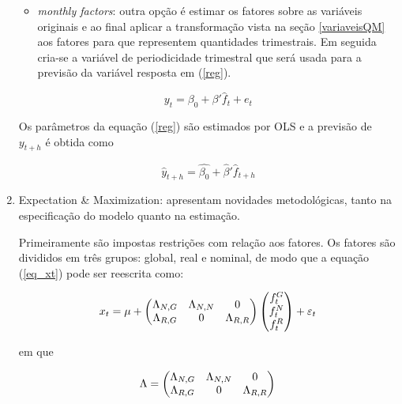 \documentclass{article}
\begin{document}
\begin{enumerate}
\begin{itemize}
\item \textit{monthly factors}: outra opção é estimar os fatores sobre as variáveis originais e ao final aplicar a transformação vista na seção \ref{variaveisQM} aos fatores para que representem quantidades trimestrais. Em seguida cria-se a variável de periodicidade trimestral que será usada para a previsão da variável resposta em (\ref{reg}).
\end{itemize}




\begin{equation}\label{reg}
y_t = \beta_0 + \beta' \hat{f}_t  + e_t
\end{equation}

Os parâmetros da equação (\ref{reg}) são estimados por OLS e a previsão de $y_{t+h}$ é obtida como

\begin{equation}
\hat{y}_{t+h} = \hat{\beta_0} + \hat{\beta}' \hat{f}_{t+h}
\end{equation}

\item Expectation \& Maximization: \cite{banburaetal2011} apresentam novidades metodológicas, tanto na especificação do modelo quanto na estimação.

Primeiramente são impostas restrições com relação aos fatores. Os fatores são divididos em três grupos: global, real e nominal, de modo que a equação (\ref{eq_xt}) pode ser reescrita como:

\begin{equation}
x_t = \mu + \begin{pmatrix}
  \Lambda_{N,G} & \Lambda_{N,N}  & 0\\
  \Lambda_{R,G} & 0  & \Lambda_{R,R}
\end{pmatrix}
\begin{pmatrix}
  f_t^G \\
  f_t^N \\
  f_t^R
\end{pmatrix} + \varepsilon_t\\
\end{equation}

em que

\begin{equation}
\Lambda = \begin{pmatrix}
  \Lambda_{N,G} & \Lambda_{N,N}  & 0\\
  \Lambda_{R,G} & 0  & \Lambda_{R,R}
\end{pmatrix}\\
\end{equation}


\end{enumerate}
\end{document}
